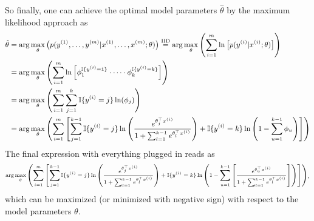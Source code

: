 \documentclass[a4paper,11pt]{article}
\numberwithin{equation}{section}
\begin{document}
{So finally, one can achieve the optimal model parameters $\hat{\theta}$ by the maximum likelihood approach as \begin{align}\small
	\begin{aligned}
		\hat{\theta} &= \arg\max_\theta\left(p(y^{(1)},\dots,y^{(m)}|x^{(1)},\dots,x^{(m)};\theta)\right) \overset{\text{IID}}{=} \arg\max_\theta\left(\sum_{i=1}^{m}\ln\left[p(y^{(i)}|x^{(i)};\theta)\right]\right) \\
		&= \arg\max_\theta\left(\sum_{i=1}^{m}\ln\left[\phi_1^{\mathbb{I}\{y^{(i)}=1\}}\cdot \dots \cdot \phi_k^{\mathbb{I}\{y^{(i)}=k\}}\right]\right) \\
		&= \arg\max_\theta\left(\sum_{i=1}^{m}\sum_{j=1}^{k}\mathbb{I}\{y^{(i)}=j\}\ln(\phi_j)\right) \\
		&= \arg\max_\theta
		\left(
		\sum_{i=1}^m
		\left[
		\sum_{j=1}^{k-1}\mathbb{I}\{y^{(i)}=j\}\ln\left(\frac{e^{\theta_j^\top x^{(i)}}}{1+\sum_{l=1}^{k-1}e^{\theta_l^\top x^{(i)}}}\right)
		+
		\mathbb{I}\{y^{(i)}=k\}\ln\left(1-\sum_{u=1}^{k-1}\phi_u
		\right)
		\right]
		\right)
	\end{aligned}
\end{align} The final expression with everything plugged in reads as \begin{gather}\scriptsize\begin{gathered}
\arg\max_\theta
\left(
\sum_{i=1}^m
\left[
\sum_{j=1}^{k-1}\mathbb{I}\{y^{(i)}=j\}\ln\left(\frac{e^{\theta_j^\top x^{(i)}}}{1+\sum_{l=1}^{k-1}e^{\theta_l^\top x^{(i)}}}\right)
+
\mathbb{I}\{y^{(i)}=k\}\ln\left(1-\sum_{u=1}^{k-1}\left[\frac{e^{\theta_u^\top x^{(i)}}}{1 + \sum_{l=1}^{k-1}e^{\theta_l^\top x^{(i)}}}\right]
\right)
\right]
\right)
\end{gathered},\end{gather}
which can be maximized (or minimized with negative sign) with respect to the model parameters $\theta$.
}
\end{document}

